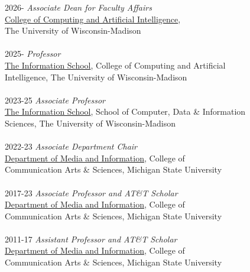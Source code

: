 \documentclass[9pt]{extarticle}
\makeatletter
\renewcommand{\section}{%
  \@startsection{section}{1}{0em}{\baselineskip}{3pt}{\large\bfseries\textsc}}
\makeatother
\begin{document}
\section{Appointments}
\begin{tabbing}
2026-  \hspace{0.435in}\= \emph{Associate Dean for Faculty Affairs} \\
\> \href{https://cai.wisc.edu}{College of Computing and Artificial Intelligence},   \\ 
\> The University of Wisconsin-Madison \\\\
2025-  \hspace{0.435in}\= \emph{Professor} \\
\> \href{https://ischool.wisc.edu}{The Information School}, College of Computing and Artificial  \\ 
\> Intelligence, The University of Wisconsin-Madison \\\\
2023-25  \hspace{0.3in}\= \emph{Associate Professor} \\
\> \href{https://ischool.wisc.edu}{The Information School}, School of Computer, Data \& Information \\ 
\> Sciences, The University of Wisconsin-Madison \\\\
2022-23  \hspace{0.3in}\= \emph{Associate Department Chair} \\
\> \href{https://mi.msu.edu/}{Department of Media and Information}, College of \\
\> Communication Arts \& Sciences, Michigan State University \\\\
2017-23  \hspace{0.3in}\= \emph{Associate Professor and AT\&T Scholar} \\
\> \href{https://mi.msu.edu/}{Department of Media and Information}, College of \\
\> Communication Arts \& Sciences, Michigan State University \\\\
2011-17  \hspace{0.3in}\= \emph{Assistant Professor and AT\&T Scholar} \\
\> \href{http://mi.msu.edu/}{Department of Media and Information}, College of \\
\> Communication Arts \& Sciences, Michigan State University \\\\

\end{tabbing}
\end{document}
